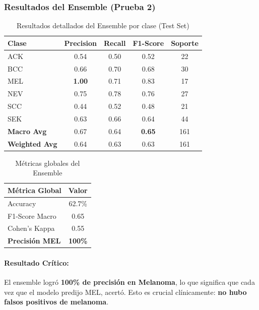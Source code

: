\documentclass[12pt,a4paper]{article}
\begin{document}
\subsubsection{Resultados del Ensemble (Prueba 2)}

\begin{table}[H]
\centering
\begin{tabular}{lcccc}
\toprule
\textbf{Clase} & \textbf{Precision} & \textbf{Recall} & \textbf{F1-Score} & \textbf{Soporte} \\
\midrule
ACK & 0.54 & 0.50 & 0.52 & 22 \\
BCC & 0.66 & 0.70 & 0.68 & 30 \\
\rowcolor{green!20} MEL & \textbf{1.00} & 0.71 & 0.83 & 17 \\
NEV & 0.75 & 0.78 & 0.76 & 27 \\
SCC & 0.44 & 0.52 & 0.48 & 21 \\
SEK & 0.63 & 0.66 & 0.64 & 44 \\
\midrule
\textbf{Macro Avg} & 0.67 & 0.64 & \textbf{0.65} & 161 \\
\textbf{Weighted Avg} & 0.64 & 0.63 & 0.63 & 161 \\
\bottomrule
\end{tabular}
\caption{Resultados detallados del Ensemble por clase (Test Set)}
\label{tab:ensemble_detalle}
\end{table}

\begin{table}[H]
\centering
\begin{tabular}{lc}
\toprule
\textbf{Métrica Global} & \textbf{Valor} \\
\midrule
Accuracy & 62.7\% \\
F1-Score Macro & 0.65 \\
Cohen's Kappa & 0.55 \\
\rowcolor{green!20} \textbf{Precisión MEL} & \textbf{100\%} \\
\bottomrule
\end{tabular}
\caption{Métricas globales del Ensemble}
\label{tab:ensemble_global}
\end{table}

\paragraph{Resultado Crítico:} El ensemble logró \textbf{100\% de precisión en Melanoma}, lo que significa que cada vez que el modelo predijo MEL, acertó. Esto es crucial clínicamente: \textbf{no hubo falsos positivos de melanoma}.
\end{document}
